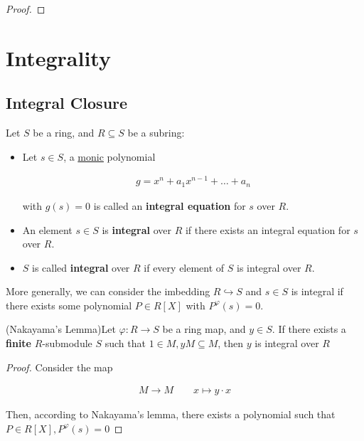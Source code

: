 \documentclass[Total.tex]{subfiles}
\begin{document}
			\begin{lemma}
			\end{lemma}
			
			\begin{proof}
			\end{proof}
			

	\chapter{Integrality}
	
		\section{Integral Closure}
		
			\begin{Def}
				Let $S$ be a ring, and $R\subseteq S$ be a subring:
				
				\begin{itemize}
					\item Let $s\in S$, a \underline{monic} polynomial
					
					\begin{gather*}
						g=x^n+a_1x^{n-1}+\dots+a_n
					\end{gather*}
					
					with $g(s)=0$ is called an \textbf{integral equation} for $s$ over $R$.
					
					\item An element $s\in S$ is \textbf{integral} over $R$ if there exists an integral equation for $s$ over $R$.
					\item $S$ is called \textbf{integral} over $R$ if every element of $S$ is integral over $R$.
				\end{itemize}
			\end{Def}
			
			More generally, we can consider the imbedding $R\hookrightarrow S$ and $s\in S$ is integral if there exists some polynomial $P\in R[X]$ with $P^\varphi(s)=0$.
			
			\begin{lemma}
				(Nakayama's Lemma)Let $\varphi:R\rightarrow S$ be a ring map, and $y\in S$. If there exists a \textbf{finite} $R$-submodule $S$ such that $1\in M,yM\subseteq M$, then $y$ is integral over $R$
			\end{lemma}
			
			\begin{proof}
				Consider the map 
				
				\begin{gather*}
					M\rightarrow M\qquad x \mapsto y\cdot x 
				\end{gather*}
				
				Then, according to Nakayama's lemma, there exists a polynomial such that $P\in R[X],P^\varphi(s)=0$
			\end{proof}
			
\end{document}
